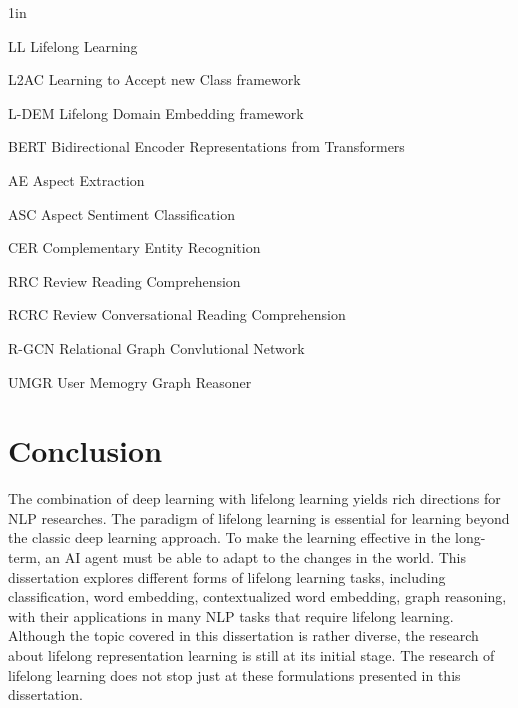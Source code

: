 \documentclass{uicthesi}
\begin{document}
\tableofcontents
\listoftables
\listoffigures
\listofabbreviations
\begin{list}
{}
{\setlength
  {}{1in}
    \setlength{\leftmargin}{1.5in}
    \setlength{\labelsep}{.5in}
    \setlength{\rightmargin}{\leftmargin}}
\item[LL\hfill] Lifelong Learning
\item[L2AC\hfill] Learning to Accept new Class framework
\item[L-DEM\hfill] Lifelong Domain Embedding framework
\item[BERT\hfill] Bidirectional Encoder Representations from Transformers
\item[AE\hfill] Aspect Extraction
\item[ASC\hfill] Aspect Sentiment Classification
\item[CER\hfill] Complementary Entity Recognition
\item[RRC\hfill] Review Reading Comprehension
\item[RCRC\hfill] Review Conversational Reading Comprehension
\item[R-GCN\hfill] Relational Graph Convlutional Network
\item[UMGR\hfill] User Memogry Graph Reasoner
\end{list}









\chapter{Conclusion}
\label{chap7:conclusion}
The combination of deep learning with lifelong learning yields rich directions for NLP researches.
The paradigm of lifelong learning is essential for learning beyond the classic deep learning approach.
To make the learning effective in the long-term, an AI agent must be able to adapt to the changes in the world.
This dissertation explores different forms of lifelong learning tasks, including classification, word embedding, contextualized word embedding, graph reasoning, with their applications in many NLP tasks that require lifelong learning.
Although the topic covered in this dissertation is rather diverse, the research about lifelong representation learning is still at its initial stage. 
The research of lifelong learning does not stop just at these formulations presented in this dissertation.
\end{document}
